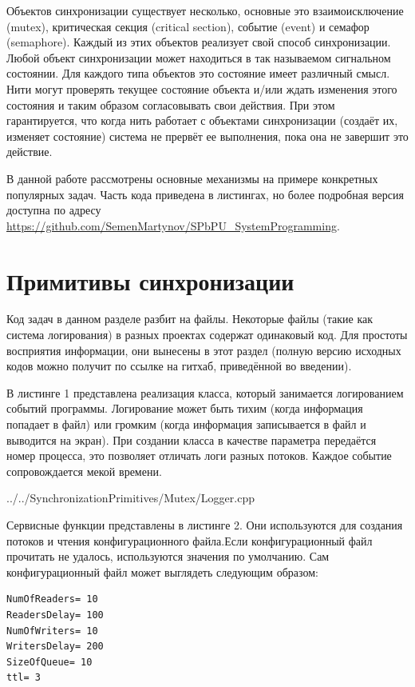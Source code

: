 \documentclass[a4paper, 12pt]{article}		%
\begin{document}
Объектов синхронизации существует несколько, основные это взаимоисключение (mutex), критическая секция (critical section), событие (event) и семафор (semaphore). Каждый из этих объектов реализует свой способ синхронизации. Любой объект синхронизации может находиться в так называемом сигнальном состоянии. Для каждого типа объектов это состояние имеет различный смысл. Нити могут проверять текущее состояние объекта и/или ждать изменения этого состояния и таким образом согласовывать свои действия. При этом гарантируется, что когда нить работает с объектами синхронизации (создаёт их, изменяет состояние) система не прервёт ее выполнения, пока она не завершит это действие. 

В данной работе рассмотрены основные механизмы на примере конкретных популярных задач. Часть кода приведена в листингах, но более подробная версия доступна по адресу \\ \url{https://github.com/SemenMartynov/SPbPU_SystemProgramming}.

\newpage
\section{Примитивы синхронизации}

Код задач в данном разделе разбит на файлы. Некоторые файлы (такие как система логирования) в разных проектах содержат одинаковый код. Для простоты восприятия информации, они вынесены в этот раздел (полную версию исходных кодов можно получит по ссылке на гитхаб, приведённой во введении).

В листинге 1 представлена реализация класса, который занимается логированием событий программы. Логирование может быть тихим (когда информация попадает в файл) или громким (когда информация записывается в файл и выводится на экран). При создании класса в качестве параметра передаётся номер процесса, это позволяет отличать логи разных потоков. Каждое событие сопровождается мекой времени.


{../../SynchronizationPrimitives/Mutex/Logger.cpp}

Сервисные функции представлены в листинге 2. Они используются для создания потоков и чтения конфигурационного файла.Если конфигурационный файл прочитать не удалось, используются значения по умолчанию. Сам конфигурационный файл может выглядеть следующим образом:
\begin{verbatim}
NumOfReaders= 10
ReadersDelay= 100
NumOfWriters= 10
WritersDelay= 200
SizeOfQueue= 10
ttl= 3
\end{verbatim}
\end{document}
